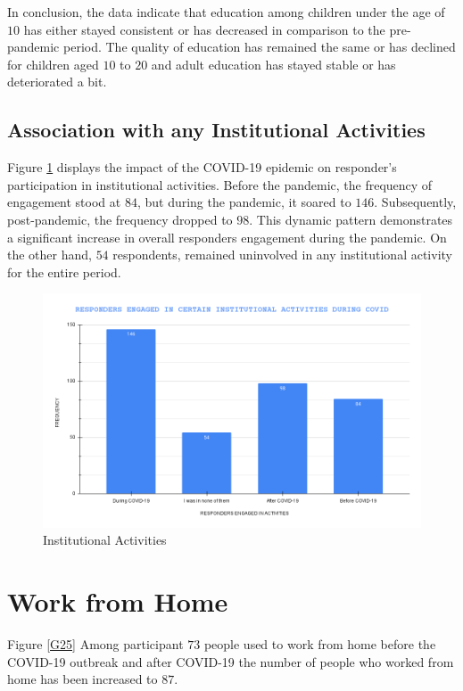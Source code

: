 In conclusion, the data indicate that education among children under the age of $10$ has either stayed consistent or has decreased in comparison to the pre-pandemic period. The quality of education has remained the same or has declined for children aged $10$ to $20$ and adult education has stayed stable or has deteriorated a bit.

\subsection{Association with any Institutional Activities}

Figure \ref{G24} displays the impact of the COVID-19 epidemic on responder's participation in institutional activities. Before the pandemic, the frequency of engagement stood at $84$, but during the pandemic, it soared to $146$. Subsequently, post-pandemic, the frequency dropped to $98$. This dynamic pattern demonstrates a significant increase in overall responders engagement during the pandemic. On the other hand, $54$ respondents, remained uninvolved in any institutional activity for the entire period.

\begin{figure}[h!]
	\centering
	\includegraphics[width=0.9\linewidth]{IMAGES/Image 24.png}
	\caption{Institutional Activities}
	\label{G24}
\end{figure}

\section{Work from Home}

Figure \ref{G25} Among participant $73$ people used to work from home before the COVID-19 outbreak and after COVID-19 the number of people who worked from home has been increased to $87$.

